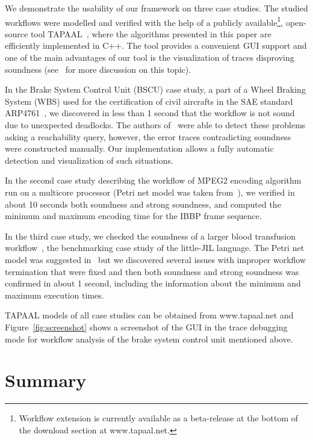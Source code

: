We demonstrate the usability of our framework on three case studies.
The studied workflows were modelled and verified with the help of 
a publicly available\footnote{Workflow extension is currently available 
as a beta-release at the bottom of the download section at www.tapaal.net.},
open-source tool TAPAAL~\cite{DJJJMS:TACAS:12}, where
the algorithms presented in this paper are efficiently implemented
in C++. The tool provides a convenient GUI support and
one of the main advantages of our tool is the visualization of traces
disproving soundness (see~\cite{FF:AWPN:06} for more discussion on 
this topic).

In the Brake System Control Unit (BSCU) case study, a part of a 
Wheel Braking System (WBS) used for the certification of civil aircrafts 
in the SAE standard ARP4761~\cite{SEB:FESCA:13}, we discovered  
in less than 1 second that the workflow is not sound due to 
unexpected deadlocks. The authors of~\cite{SEB:FESCA:13} 
were able to detect these problems asking a reachability query,
however, the error traces contradicting soundness were constructed
manually. Our implementation allows a fully automatic detection and
visualization of such situations.

In the second case study describing the workflow of MPEG2 encoding algorithm
run on a multicore processor (Petri net model was taken 
from~\cite{PCVMP:MMM:04}), we verified in about 10 seconds 
both soundness and strong soundness, and computed 
the minimum and maximum encoding time for the IBBP frame sequence.

In the third case study, we checked the soundness 
of a larger blood transfusion workflow~\cite{blood-benchmark},
the benchmarking case study of the little-JIL language. 
The Petri net model was suggested in~\cite{BLS:FHIES:12} but we discovered 
several issues with improper workflow termination that were fixed
and then both soundness and strong soundness was confirmed
in about 1 second, including the information about the minimum 
and maximum execution times. 

TAPAAL models of all case studies can be obtained from www.tapaal.net
and Figure~\ref{fig:screenshot} shows a screenshot of the GUI in the
trace debugging mode for workflow analysis of the brake system control 
unit mentioned above.

\section{Summary}\label{sumWorkflow}

